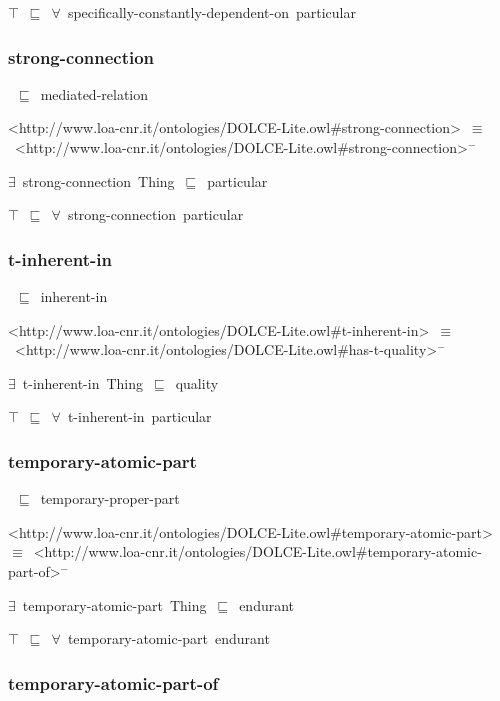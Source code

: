 \documentclass{article}
\begin{document}
\ensuremath{\top}~\ensuremath{\sqsubseteq}~\ensuremath{\forall}~specifically-constantly-dependent-on~particular

\subsubsection*{strong-connection}

~\ensuremath{\sqsubseteq}~mediated-relation

<http://www.loa-cnr.it/ontologies/DOLCE-Lite.owl#strong-connection>~\ensuremath{\equiv}~<http://www.loa-cnr.it/ontologies/DOLCE-Lite.owl#strong-connection>\ensuremath{^-}

\ensuremath{\exists}~strong-connection~Thing~\ensuremath{\sqsubseteq}~particular

\ensuremath{\top}~\ensuremath{\sqsubseteq}~\ensuremath{\forall}~strong-connection~particular

\subsubsection*{t-inherent-in}

~\ensuremath{\sqsubseteq}~inherent-in

<http://www.loa-cnr.it/ontologies/DOLCE-Lite.owl#t-inherent-in>~\ensuremath{\equiv}~<http://www.loa-cnr.it/ontologies/DOLCE-Lite.owl#has-t-quality>\ensuremath{^-}

\ensuremath{\exists}~t-inherent-in~Thing~\ensuremath{\sqsubseteq}~quality

\ensuremath{\top}~\ensuremath{\sqsubseteq}~\ensuremath{\forall}~t-inherent-in~particular

\subsubsection*{temporary-atomic-part}

~\ensuremath{\sqsubseteq}~temporary-proper-part

<http://www.loa-cnr.it/ontologies/DOLCE-Lite.owl#temporary-atomic-part>~\ensuremath{\equiv}~<http://www.loa-cnr.it/ontologies/DOLCE-Lite.owl#temporary-atomic-part-of>\ensuremath{^-}

\ensuremath{\exists}~temporary-atomic-part~Thing~\ensuremath{\sqsubseteq}~endurant

\ensuremath{\top}~\ensuremath{\sqsubseteq}~\ensuremath{\forall}~temporary-atomic-part~endurant

\subsubsection*{temporary-atomic-part-of}
\end{document}
